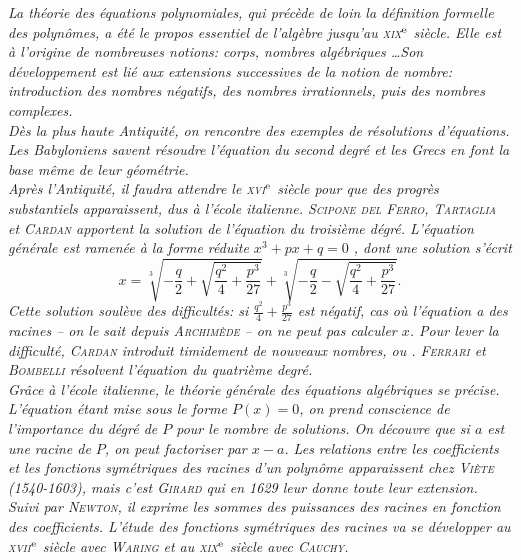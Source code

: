 \textsl{La théorie des équations polynomiales, qui précède de loin la définition formelle des polynômes, a été le propos essentiel de l'algèbre jusqu'au \textsc{xix}$^{\mathrm{e}}$ siècle. Elle est à l'origine de nombreuses notions: corps, nombres algébriques \dots Son développement est lié aux extensions successives de la notion de nombre: introduction des nombres négatifs, des nombres irrationnels, puis des nombres complexes. \\
Dès la plus haute Antiquité, on rencontre des exemples de résolutions d'équations. Les Babyloniens savent résoudre l'équation du second degré et les Grecs en font la base même de leur géométrie. \\
Après l'Antiquité, il faudra attendre le \textsc{xvi}$^{\mathrm{e}}$ siècle pour que des progrès substantiels apparaissent, dus à l'école italienne. \textsc{Scipone del Ferro}, \textsc{Tartaglia} et \textsc{Cardan} apportent la solution de l'équation du troisième dégré. L'équation générale est ramenée à la forme réduite $x^3 + px + q = 0$ \note, dont une solution s'écrit
$$x = \sqrt[3]{-\frac{q}{2} + \sqrt{\frac{q^2}{4} + \frac{p^3}{27}}} + \sqrt[3]{-\frac{q}{2} - \sqrt{\frac{q^2}{4} + \frac{p^3}{27}}}.$$
Cette solution soulève des difficultés: si $\frac{q^2}{4} + \frac{p^3}{27}$ est négatif, cas où l'équation a des racines -- on le sait depuis \textsc{Archimède} -- on ne peut pas calculer $x$. Pour lever la difficulté, \textsc{Cardan} introduit timidement de nouveaux nombres,  ou . \textsc{Ferrari} et \textsc{Bombelli} résolvent l'équation du quatrième degré. \\
Grâce à l'école italienne, le théorie générale des équations algébriques se précise. L'équation étant mise sous le forme $P(x) = 0$, on prend conscience de l'importance du dégré de $P$ pour le nombre de solutions. On découvre que si $a$ est une racine de $P$, on peut factoriser par $x-a$. Les relations entre les coefficients et les fonctions symétriques des racines d'un polynôme apparaissent chez \textsc{Viète} (1540-1603), mais c'est \textsc{Girard} qui en 1629 leur donne toute leur extension. Suivi par \textsc{Newton}, il exprime les sommes des puissances des racines en fonction des coefficients. L'étude des fonctions symétriques des racines va se développer au \textsc{xvii}$^{\mathrm{e}}$ siècle avec \textsc{Waring} et au \textsc{xix}$^{\mathrm{e}}$ siècle avec \textsc{Cauchy}. \\
}
